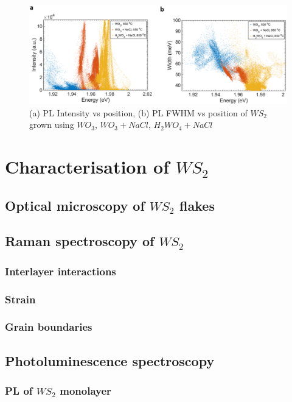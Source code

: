 \documentclass[12pt]{article}
\begin{document}
\begin{figure}[h]
\begin{center}
\includegraphics[scale=0.3]{PaperSIScatterComparison.png}
\caption{(a) PL Intensity vs position, (b) PL FWHM vs position of $WS_2$ grown using $WO_3$, $WO_3+NaCl$, $H_2WO_4+NaCl$}
\label{fig:PaperSIScatterComparison}
\end{center}
\end{figure}


\section{Characterisation of $WS_2$}
	\subsection{Optical microscopy of $WS_2$ flakes}
	\subsection{Raman spectroscopy of $WS_2$}
		\subsubsection{Interlayer interactions}
		\subsubsection{Strain}
		\subsubsection{Grain boundaries}
	\subsection{Photoluminescence spectroscopy}
		\subsubsection{PL of $WS_2$ monolayer}
\end{document}
